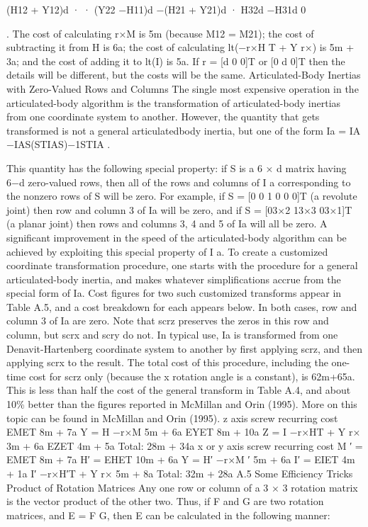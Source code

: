 (H12 + Y12)d · · (Y22 −H11)d −(H21 + Y21)d · H32d −H31d 0

. The cost of calculating r×M is 5m (because M12 = M21); the cost of subtracting it from H is 6a; the cost of calculating lt(−r×H T + Y r×) is 5m + 3a; and the cost of adding it to lt(I) is 5a. If r = [d 0 0]T or [0 d 0]T then the details will be different, but the costs will be the same. Articulated-Body Inertias with Zero-Valued Rows and Columns The single most expensive operation in the articulated-body algorithm is the transformation of articulated-body inertias from one coordinate system to another. However, the quantity that gets transformed is not a general articulatedbody inertia, but one of the form Ia = IA −IAS(STIAS)−1STIA .

This quantity has the following special property: if S is a 6 × d matrix having 6−d zero-valued rows, then all of the rows and columns of I a corresponding to the nonzero rows of S will be zero. For example, if S = [0 0 1 0 0 0]T (a revolute joint) then row and column 3 of Ia will be zero, and if S = [03×2 13×3 03×1]T (a planar joint) then rows and columns 3, 4 and 5 of Ia will all be zero. A significant improvement in the speed of the articulated-body algorithm can be achieved by exploiting this special property of I a. To create a customized coordinate transformation procedure, one starts with the procedure for a general articulated-body inertia, and makes whatever simplifications accrue from the special form of Ia. Cost figures for two such customized transforms appear in Table A.5, and a cost breakdown for each appears below. In both cases, row and column 3 of Ia are zero. Note that scrz preserves the zeros in this row and column, but scrx and scry do not. In typical use, Ia is transformed from one Denavit-Hartenberg coordinate system to another by first applying scrz, and then applying scrx to the result. The total cost of this procedure, including the one-time cost for scrz only (because the x rotation angle is a constant), is 62m+65a. This is less than half the cost of the general transform in Table A.4, and about 10\% better than the figures reported in McMillan and Orin (1995). More on this topic can be found in McMillan and Orin (1995). z axis screw recurring cost EMET 8m + 7a Y = H −r×M 5m + 6a EYET 8m + 10a Z = I −r×HT + Y r× 3m + 6a EZET 4m + 5a Total: 28m + 34a x or y axis screw recurring cost M ′ = EMET 8m + 7a H′ = EHET 10m + 6a Y = H′ −r×M ′ 5m + 6a I′ = EIET 4m + 1a I′ −r×H′T + Y r× 5m + 8a Total: 32m + 28a A.5 Some Efficiency Tricks Product of Rotation Matrices Any one row or column of a 3 × 3 rotation matrix is the vector product of the other two. Thus, if F and G are two rotation matrices, and E = F G, then E can be calculated in the following manner:

